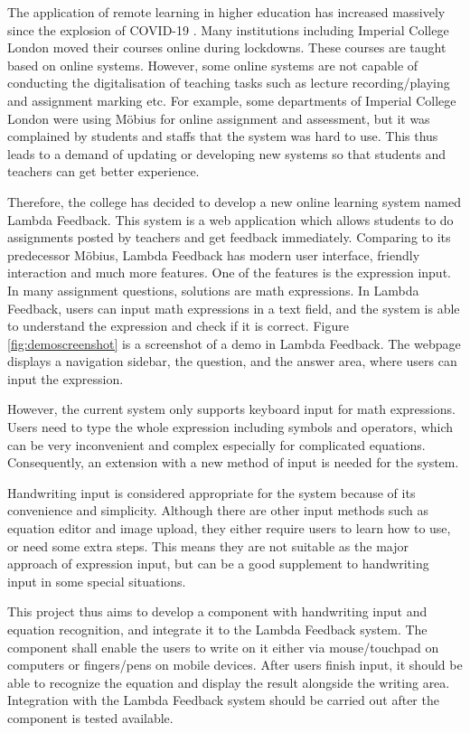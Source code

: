 \documentclass[12pt,twoside]{report}
\begin{document}
The application of remote learning in higher education has increased massively
since the explosion of COVID-19 \cite{remotelearning}. Many institutions including Imperial College
London moved their courses online during lockdowns. These courses are taught
based on online systems. However, some online systems are not capable of
conducting the digitalisation of teaching tasks such as lecture
recording/playing and assignment marking etc. For example, some departments of  Imperial College
London were using Möbius for online assignment and assessment, but it was complained by students and staffs that the system was hard to use. This thus leads to a demand of updating or developing new systems so that students and teachers can get better experience.

Therefore, the college has decided to develop a new online learning system named
Lambda Feedback. This system is a web application which allows students to do assignments posted by teachers and get feedback immediately. Comparing to its predecessor Möbius, Lambda
Feedback has modern user interface, friendly interaction and much more features.
One of the features is the expression input. In many assignment questions,
solutions are math expressions. In Lambda Feedback, users can input math
expressions in a text field, and the system is able to understand the expression
and check if it is correct. Figure \ref{fig:demoscreenshot} is a screenshot of a
demo in Lambda Feedback. The webpage displays a navigation sidebar,
the question, and the answer area, where users can input the expression.

However, the current system only supports keyboard input for math expressions.
Users need to type the whole expression including symbols and operators, which
can be very inconvenient and complex especially for complicated equations.
Consequently, an extension with a new method of input is needed for the system.

Handwriting input is considered appropriate for the system because of its
convenience and simplicity. Although there are other input methods such as
equation editor and image upload, they either require users to learn how to use,
or need some extra steps. This means they are not suitable as the major approach
of expression input, but can be a good supplement to handwriting input in some
special situations.

This project thus aims to develop a component with handwriting input and
equation recognition, and integrate it to the Lambda Feedback system. The
component shall enable the users to write on it either via mouse/touchpad on
computers or fingers/pens on mobile devices. After users finish input, it should
be able to recognize the equation and display the result alongside the writing
area. Integration with the Lambda Feedback system should be carried out after
the component is tested available.
\end{document}

